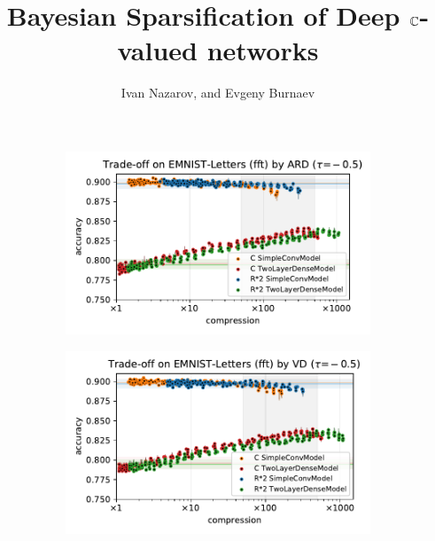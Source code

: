 \documentclass[a4paper,10pt,onecolumn]{article}
\title{Bayesian Sparsification of Deep $\mathbb{C}$-valued networks}
\author{Ivan Nazarov, and Evgeny Burnaev}
\begin{document}
\maketitle
\listoffigures

\clearpage

\begin{figure}[b]
  \centering
  \begin{subfigure}[b]{0.5\columnwidth}
    \centering
    \includegraphics[width=\columnwidth]{figure__mnist-like__trade-off/appendix__cmp__ARD__emnist_letters__fft__-0.5.pdf}
  \end{subfigure}%
  \begin{subfigure}[b]{0.5\columnwidth}
    \centering
    \includegraphics[width=\columnwidth]{figure__mnist-like__trade-off/appendix__cmp__VD__emnist_letters__fft__-0.5.pdf}
  \end{subfigure} \\ %
  \begin{subfigure}[b]{0.5\columnwidth}
    \centering

\end{subfigure}
\end{figure}
\end{document}
